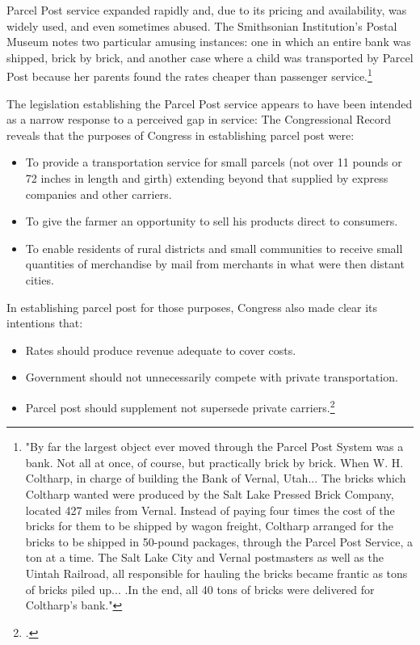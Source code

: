 Parcel Post service expanded rapidly and, due to its pricing and availability, was widely used, and even sometimes abused.  The Smithsonian Institution’s Postal Museum notes two particular amusing instances: one in which an entire bank was shipped, brick by brick, and another case where a child was transported by Parcel Post because her parents found the rates cheaper than passenger service.\footnote{"By far the largest object ever moved through the Parcel Post System was a bank. Not all at once, of course, but practically brick by brick. When W. H. Coltharp, in charge of building the Bank of Vernal, Utah... The bricks which Coltharp wanted were produced by the Salt Lake Pressed Brick Company, located 427 miles from Vernal. Instead of paying four times the cost of the bricks for them to be shipped by wagon freight, Coltharp arranged for the bricks to be shipped in 50-pound packages, through the Parcel Post Service, a ton at a time. The Salt Lake City and Vernal postmasters as well as the Uintah Railroad, all responsible for hauling the bricks became frantic as tons of bricks piled up... .In the end, all 40 tons of bricks were delivered for Coltharp's bank."}

The legislation establishing the Parcel Post service appears to have been intended as a narrow response to a perceived gap in service: The Congressional Record reveals that the purposes of Congress in establishing parcel post were:
\begin{itemize}
	\item To provide a transportation service for small parcels (not over 11 pounds or 72 inches in length and girth) extending beyond that supplied by express companies and other carriers.
	\item To give the farmer an opportunity to sell his products direct to consumers.
	\item To enable residents of rural districts and small communities to receive small quantities of merchandise by mail from merchants in what were then distant cities.
\end{itemize}

In establishing parcel post for those purposes, Congress also made clear its intentions that:
\begin{itemize}
	\item Rates should produce revenue adequate to cover costs.
	\item Government should not unnecessarily compete with private transportation.
	\item Parcel post should supplement not supersede private carriers.\footcite{REA1}
\end{itemize}


